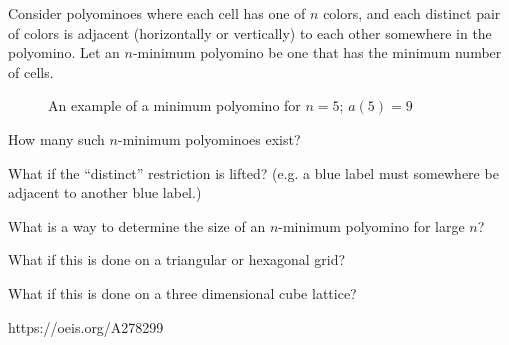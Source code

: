 \documentclass{article}
\begin{document}
  Consider polyominoes where each cell has one of $n$ colors, and
  each distinct pair of colors is adjacent (horizontally or vertically) to each other
  somewhere in the polyomino. Let an $n$-minimum polyomino be one that has the
  minimum number of cells.

\begin{figure}[!h]
  \centering
  \caption{An example of a minimum polyomino for $n = 5$; $a(5)=9$}
\end{figure}

\begin{question}
  How many such $n$-minimum polyominoes exist?
\end{question}
\begin{related}
  \item What if the ``distinct'' restriction is lifted?
    (e.g. a blue label must somewhere be adjacent to another blue label.)
  \item What is a way to determine the size of an $n$-minimum polyomino for
    large $n$?
  \item What if this is done on a triangular or hexagonal grid?
  \item What if this is done on a three dimensional cube lattice?
\end{related}

\begin{references}
  \item https://oeis.org/A278299
\end{references}
\end{document}
